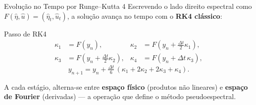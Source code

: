 \begin{frame}{Evolução no Tempo por Runge--Kutta 4}
  Escrevendo o lado direito espectral como $F(\hat\eta,\hat u) = (\hat\eta_t,\hat u_t)$, a
  solução avança no tempo com o \textbf{RK4 clássico}:
  \begin{block}{Passo de RK4}
    \small
    \begin{equation*}
      \begin{aligned}
        \kappa_1 &= F(y_n), &
        \kappa_2 &= F\!\left(y_n + \tfrac{\Delta t}{2}\kappa_1\right), \\
        \kappa_3 &= F\!\left(y_n + \tfrac{\Delta t}{2}\kappa_2\right), &
        \kappa_4 &= F\!\left(y_n + \Delta t\,\kappa_3\right),
      \end{aligned}
    \end{equation*}
    \vspace{-0.2cm}
    \begin{equation*}
      y_{n+1} = y_n + \tfrac{\Delta t}{6}\,(\kappa_1 + 2\kappa_2 + 2\kappa_3 + \kappa_4).
    \end{equation*}
  \end{block}
  A cada estágio, alterna-se entre \textbf{espaço físico} (produtos não lineares) e
  \textbf{espaço de Fourier} (derivadas) --- a operação que define o método pseudoespectral.
\end{frame}
